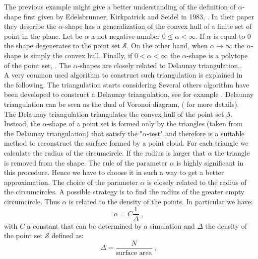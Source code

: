 The previous example might give a better understanding of the definition of $\alpha$-shape first given by Edelsbrunner, Kirkpatrick and Seidel in 1983, \cite{edelsbrunner1983shape}. In their paper they describe the $\alpha$-shape has a generalization of the convex hull of a finite set of point in the plane. Let be $\alpha$ a not negative number $0\leq\alpha<\infty$. 
If $\alpha$ is equal to $0$ the shape degenerates to the point set $\mathcal{S}$. On the other hand, when $\alpha\rightarrow\infty$ the $\alpha$-shape is simply the convex hull. Finally, if $0<\alpha<\infty$ the $\alpha$-shape is a polytope of the point set, \cite{edelsbrunner1994three}. The $\alpha$-shapes are closely related to Delaunay triangulation,\cite{mucke1993shapes}.\\ \indent
 A very common used algorithm to construct such triangulation is explained in the following. The triangulation starts considering
Several others algorithm have been developed to construct a Delaunay triangulation, see for example \cite{lee1980two, renka1997algorithm}.
Delaunay triangulation can be seen as the dual of Voronoi diagram, (\cite{fortune1992voronoi} for more details). 
\\ \indent The Delaunay triangulation triangulates the convex hull of the point set $\mathcal{S}$. Instead, the $\alpha$-shape of a point set is formed only by the triangles (taken from the Delaunay triangulation) that satisfy the "$\alpha$-test" and therefore is a suitable method to reconstruct the surface formed by a point cloud.
For each triangle we calculate the radius of the circumcircle. If the radius is larger that $\alpha$ the triangle is removed from the shape. The rule of the parameter $\alpha$ is highly significant in this procedure. Hence we have to choose it in such a way to get a better approximation. The choice of the parameter $\alpha$ is closely related to the radius of the circumcircles. A possible strategy is to find the radius of the greater empty circumcircle. Thus $\alpha$ is related to the density of the points. In particular we have:
\begin{equation}
\alpha=C\frac{1}{\Delta}\;,
\end{equation}
with $C$ a constant that can be determined by a simulation and $\Delta$ the density of the point set $\mathcal{S}$ defined as:
\begin{equation}
\Delta=\frac{N}{\mbox{surface area}}\; ,
\end{equation}
